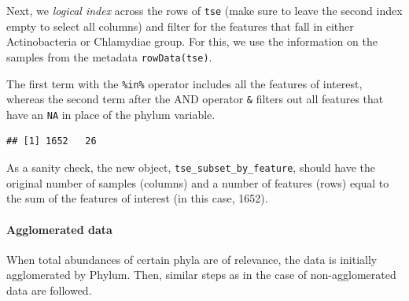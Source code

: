 \documentclass[
]{book}
\newenvironment{Shaded}{\begin{snugshade}}{\end{snugshade}}
\newcommand{\CommentTok}[1]{\textcolor[rgb]{0.56,0.35,0.01}{\textit{#1}}}
\newcommand{\FunctionTok}[1]{\textcolor[rgb]{0.00,0.00,0.00}{#1}}
\newcommand{\NormalTok}[1]{#1}
\newcommand{\OtherTok}[1]{\textcolor[rgb]{0.56,0.35,0.01}{#1}}
\newcommand{\SpecialCharTok}[1]{\textcolor[rgb]{0.00,0.00,0.00}{#1}}
\newcommand{\StringTok}[1]{\textcolor[rgb]{0.31,0.60,0.02}{#1}}
\begin{document}
Next, we \emph{logical index} across the rows of \texttt{tse} (make sure to leave
the second index empty to select all columns) and filter for the
features that fall in either Actinobacteria or Chlamydiae group. For this,
we use the information on the samples from the metadata
\texttt{rowData(tse)}.

The first term with the \texttt{\%in\%} operator includes all the features
of interest, whereas the second term after the AND operator \texttt{\&}
filters out all features that have an \texttt{NA} in place of the phylum variable.

\begin{Shaded}
\end{Shaded}

\begin{verbatim}
## [1] 1652   26
\end{verbatim}

As a sanity check, the new object, \texttt{tse\_subset\_by\_feature}, should have the original number of samples (columns) and a number of features (rows) equal to the sum of the features of interest (in this case, 1652).

\hypertarget{agglomerated-data}{%
\paragraph{Agglomerated data}\label{agglomerated-data}}

When total abundances of certain phyla are of relevance, the data is initially agglomerated by Phylum. Then, similar steps as in the case of non-agglomerated data are followed.
\end{document}
